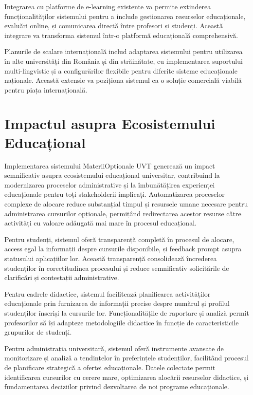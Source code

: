 \documentclass[12pt,a4paper]{report}
\begin{document}
Integrarea cu platforme de e-learning existente va permite extinderea funcționalităților sistemului pentru a include gestionarea resurselor educaționale, evaluări online, și comunicarea directă între profesori și studenți. Această integrare va transforma sistemul într-o platformă educațională comprehensivă.

Planurile de scalare internațională includ adaptarea sistemului pentru utilizarea în alte universități din România și din străinătate, cu implementarea suportului multi-lingvistic și a configurărilor flexibile pentru diferite sisteme educaționale naționale. Această extensie va poziționa sistemul ca o soluție comercială viabilă pentru piața internațională.

\section{Impactul asupra Ecosistemului Educațional}

Implementarea sistemului MateriiOptionale UVT generează un impact semnificativ asupra ecosistemului educațional universitar, contribuind la modernizarea proceselor administrative și la îmbunătățirea experienței educaționale pentru toți stakeholderii implicați. Automatizarea proceselor complexe de alocare reduce substanțial timpul și resursele umane necesare pentru administrarea cursurilor opționale, permițând redirectarea acestor resurse către activități cu valoare adăugată mai mare în procesul educațional.

Pentru studenți, sistemul oferă transparență completă în procesul de alocare, access egal la informații despre cursurile disponibile, și feedback prompt asupra statusului aplicațiilor lor. Această transparență consolidează încrederea studenților în corectitudinea procesului și reduce semnificativ solicitările de clarificări și contestații administrative.

Pentru cadrele didactice, sistemul facilitează planificarea activităților educaționale prin furnizarea de informații precise despre numărul și profilul studenților înscriși la cursurile lor. Funcționalitățile de raportare și analiză permit profesorilor să își adapteze metodologiile didactice în funcție de caracteristicile grupurilor de studenți.

Pentru administrația universitară, sistemul oferă instrumente avansate de monitorizare și analiză a tendințelor în preferințele studenților, facilitând procesul de planificare strategică a ofertei educaționale. Datele colectate permit identificarea cursurilor cu cerere mare, optimizarea alocării resurselor didactice, și fundamentarea deciziilor privind dezvoltarea de noi programe educaționale.
\end{document}
